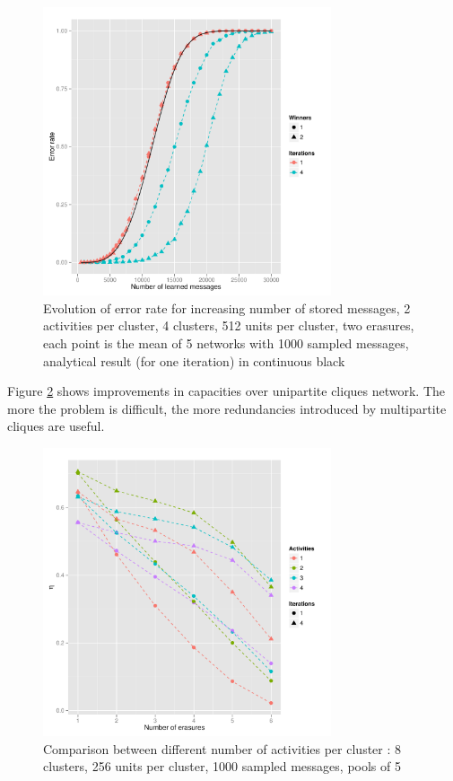 \documentclass[english,11pt,twocolumn]{article}
\theoremstyle{definition}
\begin{document}
	
	\begin{figure}[!htb]
		\includegraphics[width=8.5cm]{Courbes/remplacement_figure2g1} %
		\caption{Evolution of error rate for increasing number of stored messages, 2 activities per cluster, 4 clusters, 512 units per cluster, two erasures, each point is the mean of 5 networks with 1000 sampled messages, analytical result (for one iteration) in continuous black}
			\label{erasuresth}
		\end{figure}
		
		Figure \ref{comperth} shows improvements in capacities over unipartite cliques network. The more the problem is difficult, the more redundancies introduced by multipartite cliques are useful.
		
		\begin{figure}[!htb]
		\includegraphics[width=8.5cm]{Courbes/5portant_erasures_c8l256}
		\caption{Comparison between different number of activities per cluster :  8 clusters, 256 units per cluster, 1000 sampled messages, pools of 5}
		\label{comperth}
	\end{figure}
%	
	
\end{document}
